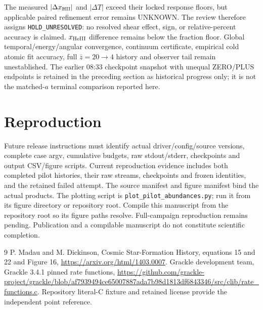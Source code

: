 \documentclass[11pt]{article}
\begin{document}
The measured $|\Delta x_{\rm HII}|$ and $|\Delta T|$ exceed their locked response floors, but applicable paired refinement error remains UNKNOWN. The review therefore assigns \texttt{HOLD\_UNRESOLVED}: no resolved shear effect, sign, or relative-percent accuracy is claimed. $x_{\rm HeIII}$ difference remains below the fraction floor. Global temporal/energy/angular convergence, continuum certificate, empirical cold atomic fit accuracy, full $\bar z=20\to4$ history and observer tail remain unestablished. The earlier 08:33 checkpoint snapshot with unequal ZERO/PLUS endpoints is retained in the preceding section as historical progress only; it is not the matched-$a$ terminal comparison reported here.

\section{Reproduction}
Future release instructions must identify actual driver/config/source versions, complete case argv, cumulative budgets, raw stdout/stderr, checkpoints and output CSV/figure scripts. Current reproduction evidence includes both completed pilot histories, their raw streams, checkpoints and frozen identities, and the retained failed attempt. The source manifest and figure manifest bind the actual products. The plotting script is \texttt{plot\_pilot\_abundances.py}; run it from its figure directory or repository root. Compile this manuscript from the repository root so its figure paths resolve. Full-campaign reproduction remains pending. Publication and a compilable manuscript do not constitute scientific completion.
\begin{thebibliography}{9}
 P. Madau and M. Dickinson, Cosmic Star-Formation History, equations 15 and 22 and Figure 16, \url{https://arxiv.org/html/1403.0007}.
 Grackle development team, Grackle 3.4.1 pinned rate functions, \url{https://github.com/grackle-project/grackle/blob/af7939494ce65007887ada7b98d1813df6843346/src/clib/rate_functions.c}. Repository literal-C fixture and retained license provide the independent point reference.
\end{thebibliography}
\end{document}
